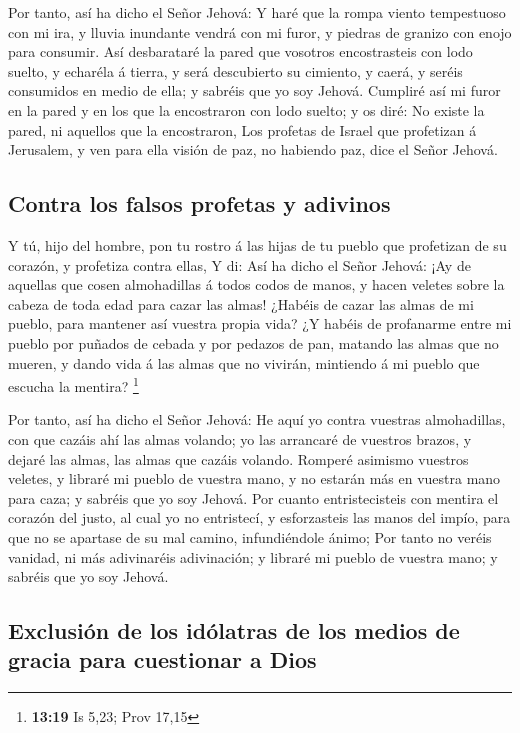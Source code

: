  Por tanto, así ha dicho el Señor Jehová: Y haré que la
rompa viento tempestuoso con mi ira, y lluvia inundante vendrá con mi
furor, y piedras de granizo con enojo para consumir.  Así
desbarataré la pared que vosotros encostrasteis con lodo suelto, y
echaréla á tierra, y será descubierto su cimiento, y caerá, y seréis
consumidos en medio de ella; y sabréis que yo soy Jehová. 
Cumpliré así mi furor en la pared y en los que la encostraron con lodo
suelto; y os diré: No existe la pared, ni aquellos que la encostraron,
 Los profetas de Israel que profetizan á Jerusalem, y ven
para ella visión de paz, no habiendo paz, dice el Señor Jehová.

\hypertarget{contra-los-falsos-profetas-y-adivinos}{%
\subsection{Contra los falsos profetas y
adivinos}\label{contra-los-falsos-profetas-y-adivinos}}

 Y tú, hijo del hombre, pon tu rostro á las hijas de tu
pueblo que profetizan de su corazón, y profetiza contra ellas,
 Y di: Así ha dicho el Señor Jehová: ¡Ay de aquellas que
cosen almohadillas á todos codos de manos, y hacen veletes sobre la
cabeza de toda edad para cazar las almas! ¿Habéis de cazar las almas de
mi pueblo, para mantener así vuestra propia vida?  ¿Y
habéis de profanarme entre mi pueblo por puñados de cebada y por pedazos
de pan, matando las almas que no mueren, y dando vida á las almas que no
vivirán, mintiendo á mi pueblo que escucha la mentira? \footnote{\textbf{13:19}
  Is 5,23; Prov 17,15}

 Por tanto, así ha dicho el Señor Jehová: He aquí yo contra
vuestras almohadillas, con que cazáis ahí las almas volando; yo las
arrancaré de vuestros brazos, y dejaré las almas, las almas que cazáis
volando.  Romperé asimismo vuestros veletes, y libraré mi
pueblo de vuestra mano, y no estarán más en vuestra mano para caza; y
sabréis que yo soy Jehová.  Por cuanto entristecisteis con
mentira el corazón del justo, al cual yo no entristecí, y esforzasteis
las manos del impío, para que no se apartase de su mal camino,
infundiéndole ánimo;  Por tanto no veréis vanidad, ni más
adivinaréis adivinación; y libraré mi pueblo de vuestra mano; y sabréis
que yo soy Jehová.

\hypertarget{exclusiuxf3n-de-los-iduxf3latras-de-los-medios-de-gracia-para-cuestionar-a-dios}{%
\subsection{Exclusión de los idólatras de los medios de gracia para
cuestionar a
Dios}\label{exclusiuxf3n-de-los-iduxf3latras-de-los-medios-de-gracia-para-cuestionar-a-dios}}

